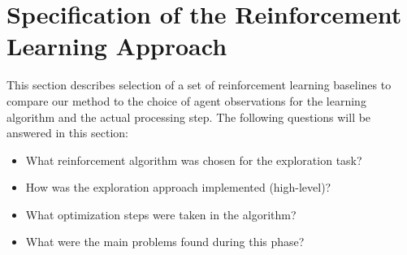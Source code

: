 



\section{Specification of the Reinforcement Learning Approach}\label{chap:3:specification-approach}

This section describes selection of a set of reinforcement learning baselines to compare our method to the choice of agent observations for the learning algorithm and the actual processing step. The following questions will be answered in this section:
\begin{itemize}
    \item What reinforcement algorithm was chosen for the exploration task?
    \item How was the exploration approach implemented (high-level)?
    \item What optimization steps were taken in the algorithm?
    \item What were the main problems found during this phase?
\end{itemize}






